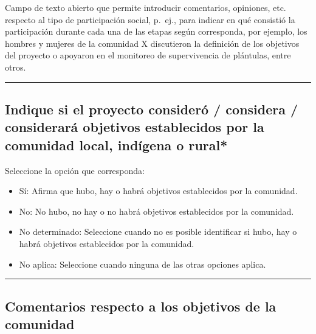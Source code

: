 \documentclass[
]{book}
\providecommand{\tightlist}{%
  \setlength{\itemsep}{0pt}\setlength{\parskip}{0pt}}
\begin{document}
Campo de texto abierto que permite introducir comentarios, opiniones, etc. respecto al tipo de participación social, p.~ej., para indicar en qué consistió la participación durante cada una de las etapas según corresponda, por ejemplo, los hombres y mujeres de la comunidad X discutieron la definición de los objetivos del proyecto o apoyaron en el monitoreo de supervivencia de plántulas, entre otros.

\begin{center}\rule{0.5\linewidth}{0.5pt}\end{center}

\hypertarget{indique-si-el-proyecto-consideruxf3-considera-consideraruxe1-objetivos-establecidos-por-la-comunidad-local-induxedgena-o-rural}{%
\subsection*{\texorpdfstring{{Indique si el proyecto consideró / considera / considerará objetivos establecidos por la comunidad local, indígena o rural*}}{Indique si el proyecto consideró / considera / considerará objetivos establecidos por la comunidad local, indígena o rural*}}\label{indique-si-el-proyecto-consideruxf3-considera-consideraruxe1-objetivos-establecidos-por-la-comunidad-local-induxedgena-o-rural}}

Seleccione la opción que corresponda:

\begin{itemize}
\tightlist
\item
  Sí: Afirma que hubo, hay o habrá objetivos establecidos por la comunidad.
\item
  No: No hubo, no hay o no habrá objetivos establecidos por la comunidad.
\item
  No determinado: Seleccione cuando no es posible identificar si hubo, hay o habrá objetivos establecidos por la comunidad.
\item
  No aplica: Seleccione cuando ninguna de las otras opciones aplica.
\end{itemize}

\begin{center}\rule{0.5\linewidth}{0.5pt}\end{center}

\hypertarget{comentarios-respecto-a-los-objetivos-de-la-comunidad}{%
\subsection*{Comentarios respecto a los objetivos de la comunidad}\label{comentarios-respecto-a-los-objetivos-de-la-comunidad}}
\end{document}
